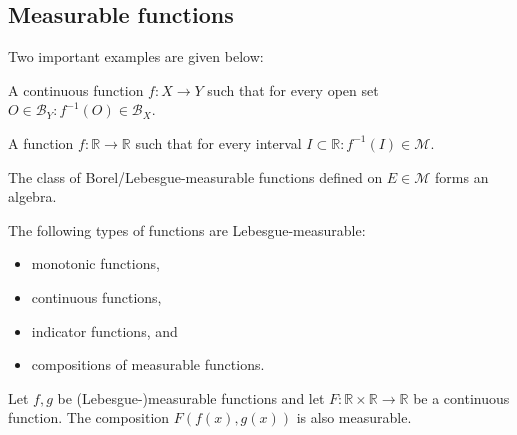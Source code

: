 \subsection{Measurable functions}


    Two important examples are given below:
    \begin{example}\label{lebesgue:borel_measurable_function}
        A continuous function $f:X\rightarrow Y$ such that for every open set $O\in\mathcal{B}_Y:f^{-1}(O)\in\mathcal{B}_X$.
    \end{example}
    \begin{example}\label{lebesgue:measurable_function}
        A function $f:\mathbb{R}\rightarrow\mathbb{R}$ such that for every interval $I\subset\mathbb{R}:f^{-1}(I)\in\mathcal{M}$.
    \end{example}

    \begin{property}
        The class of Borel/Lebesgue-measurable functions defined on $E\in\mathcal{M}$ forms an algebra.
    \end{property}

    \begin{example}
        The following types of functions are Lebesgue-measurable:
        \begin{itemize}
            \item monotonic functions,
            \item continuous functions,
            \item indicator functions, and
            \item compositions of measurable functions.
        \end{itemize}
    \end{example}
    \begin{result}
        Let $f,g$ be (Lebesgue-)measurable functions and let $F:\mathbb{R}\times\mathbb{R}\rightarrow\mathbb{R}$ be a continuous function. The composition $F(f(x),g(x))$ is also measurable.
    \end{result}

